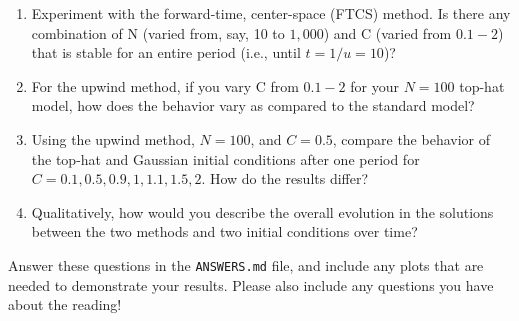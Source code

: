 \documentclass[10pt]{article}
\begin{document}
\begin{enumerate}

\item Experiment with the forward-time, center-space (FTCS) method.
  Is there any combination of N (varied from, say, 10 to $1{,}000$)
  and C (varied from $0.1-2$) that is stable for an entire period
  (i.e., until $t=1/u=10$)?

\item For the upwind method, if you vary C from $0.1-2$ for your
  $N=100$ top-hat model, how does the behavior vary as compared to the
  standard model?

\item Using the upwind method, $N=100$, and $C=0.5$, compare the
  behavior of the top-hat and Gaussian initial conditions after one
  period for $C=0.1,0.5,0.9,1,1.1, 1.5,2$.  How do the results differ?

\item Qualitatively, how would you describe the overall evolution in
  the solutions
  between the two methods and two initial conditions over time?
  
\end{enumerate}

Answer these questions in the \texttt{ANSWERS.md} file, and include
any plots that are needed to demonstrate your results.  Please also
include any questions you have about the reading!








\end{document}
